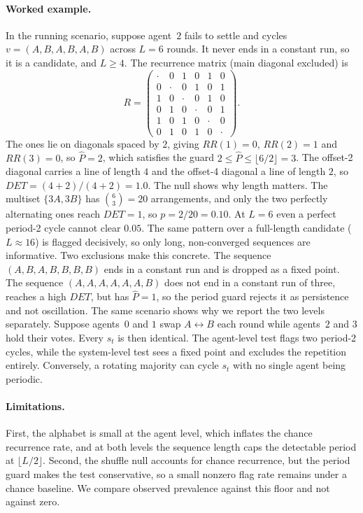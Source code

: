 \paragraph{Worked example.}
In the running scenario, suppose agent~$2$ fails to settle and cycles
$v = (A, B, A, B, A, B)$ across $L = 6$ rounds. It never ends in a constant run, so
it is a candidate, and $L \geq 4$. The recurrence matrix (main diagonal excluded)
is
\[
  R = \begin{pmatrix}
    \cdot & 0 & 1 & 0 & 1 & 0\\
    0 & \cdot & 0 & 1 & 0 & 1\\
    1 & 0 & \cdot & 0 & 1 & 0\\
    0 & 1 & 0 & \cdot & 0 & 1\\
    1 & 0 & 1 & 0 & \cdot & 0\\
    0 & 1 & 0 & 1 & 0 & \cdot
  \end{pmatrix}.
\]
The ones lie on diagonals spaced by $2$, giving $RR(1) = 0$, $RR(2) = 1$
and $RR(3) = 0$, so $\hat{P} = 2$, which satisfies the guard
$2 \leq \hat{P} \leq \lfloor 6/2 \rfloor = 3$. The offset-2 diagonal carries a line
of length $4$ and the offset-4 diagonal a line of length $2$, so
$DET = (4 + 2)/(4 + 2) = 1.0$.
The null shows why length matters. The multiset $\{3A, 3B\}$ has
$\binom{6}{3} = 20$ arrangements, and only the two perfectly alternating ones reach
$DET = 1$, so $p = 2/20 = 0.10$. At $L = 6$ even a perfect period-2 cycle cannot
clear $0.05$. The same pattern over a full-length candidate ($L \approx 16$) is
flagged decisively, so only long, non-converged sequences are informative. Two
exclusions make this concrete. The sequence $(A,B,A,B,B,B,B)$ ends in a constant
run and is dropped as a fixed point. The sequence $(A,A,A,A,A,A,B)$ does not end in a
constant run of three, reaches a high $DET$, but has $\hat{P} = 1$, so the period guard rejects it as persistence and not
oscillation.
The same scenario shows why we report the two levels separately. Suppose agents~$0$
and $1$ swap $A \leftrightarrow B$ each round while agents~$2$ and $3$ hold their
votes. Every $s_t$ is then identical. The agent-level test flags two period-2
cycles, while the system-level test sees a fixed point and excludes the repetition
entirely. Conversely, a rotating majority can cycle $s_t$ with no single agent
being periodic.

\paragraph{Limitations.}
First, the alphabet is small at the agent level, which inflates the chance
recurrence rate, and at both levels the sequence length caps the detectable period
at $\lfloor L/2 \rfloor$. Second, the shuffle null accounts for chance recurrence,
but the period guard makes the test conservative, so a small nonzero flag rate
remains under a chance baseline. We compare observed prevalence against this floor
and not against zero.
